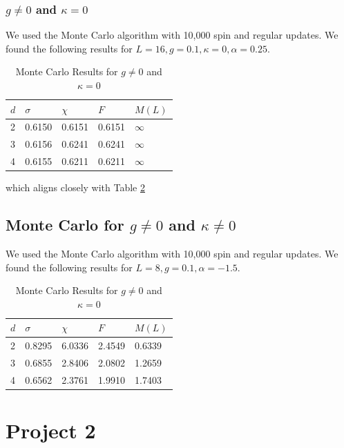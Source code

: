 \documentclass[12]{report}
\newcommand\0{\mathbf{0}}
\newcommand\<{\langle}
\renewcommand\>{\rangle}
\begin{document}
\subsection{$g\neq 0$ and $\kappa = 0$}

We used the Monte Carlo algorithm with 10,000 spin and regular updates. We found the following results for $L = 16, g = 0.1, \kappa = 0, \alpha = 0.25$.

\begin{table}[H]
\centering
\begin{tabular}{|l|l|l|l|l|}
\hline
$d$ & $\sigma$ & $\chi$ & $F$ & $M(L)$ \\ \hline
2   & 0.6150 & 0.6151 & 0.6151 & $\infty$ \\
3   & 0.6156 & 0.6241 & 0.6241 & $\infty$  \\
4   & 0.6155  & 0.6211 & 0.6211  & $\infty$ \\ \hline
\end{tabular}
\caption{Monte Carlo Results for $g\neq 0$ and $\kappa = 0$}
\end{table}

which aligns closely with Table \ref{}

\section{Monte Carlo for $g\neq0$ and $\kappa \neq 0$}


We used the Monte Carlo algorithm with 10,000 spin and regular updates. We found the following results for $L = 8, g = 0.1, \alpha = -1.5$.

\begin{table}[H]
\centering
\begin{tabular}{|l|l|l|l|l|}
\hline
$d$ & $\sigma$ & $\chi$ & $F$ & $M(L)$ \\ \hline
2   & 0.8295 & 6.0336 & 2.4549 & 0.6339 \\
3   & 0.6855 & 2.8406 & 2.0802 & 1.2659  \\
4   & 0.6562  & 2.3761 & 1.9910  & 1.7403 \\ \hline
\end{tabular}
\caption{Monte Carlo Results for $g\neq 0$ and $\kappa = 0$}
\end{table}


\chapter{Project 2}
\end{document}
